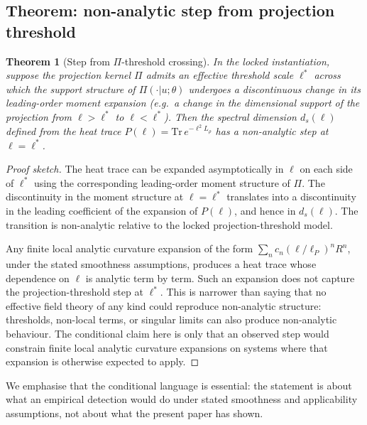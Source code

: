 ﻿\documentclass[12pt,a4paper]{article}
\newtheorem{theorem}{Theorem}
\theoremstyle{definition}
\begin{document}
\subsection{Theorem: non-analytic step from projection threshold}

\begin{theorem}[Step from $\Pi$-threshold crossing]
\label{thm:step}
In the locked instantiation, suppose the projection kernel $\Pi$ admits an effective threshold scale $\ell^\ast$ across which the support structure of $\Pi(\cdot|u;\theta)$ undergoes a discontinuous change in its leading-order moment expansion (e.g.\ a change in the dimensional support of the projection from $\ell > \ell^\ast$ to $\ell < \ell^\ast$). Then the spectral dimension $d_s(\ell)$ defined from the heat trace $P(\ell) = \mathrm{Tr}\,e^{-\ell^2 L_\rho}$ has a non-analytic step at $\ell = \ell^\ast$.
\end{theorem}

\begin{proof}[Proof sketch]
The heat trace can be expanded asymptotically in $\ell$ on each side of $\ell^\ast$ using the corresponding leading-order moment structure of $\Pi$. The discontinuity in the moment structure at $\ell = \ell^\ast$ translates into a discontinuity in the leading coefficient of the expansion of $P(\ell)$, and hence in $d_s(\ell)$. The transition is non-analytic relative to the locked projection-threshold model.

Any finite local analytic curvature expansion of the form $\sum_n c_n (\ell/\ell_P)^n R^n$, under the stated smoothness assumptions, produces a heat trace whose dependence on $\ell$ is analytic term by term. Such an expansion does not capture the projection-threshold step at $\ell^\ast$. This is narrower than saying that no effective field theory of any kind could reproduce non-analytic structure: thresholds, non-local terms, or singular limits can also produce non-analytic behaviour. The conditional claim here is only that an observed step would constrain finite local analytic curvature expansions on systems where that expansion is otherwise expected to apply.
\end{proof}

We emphasise that the conditional language is essential: the statement is about what an empirical detection would do under stated smoothness and applicability assumptions, not about what the present paper has shown.
\end{document}
